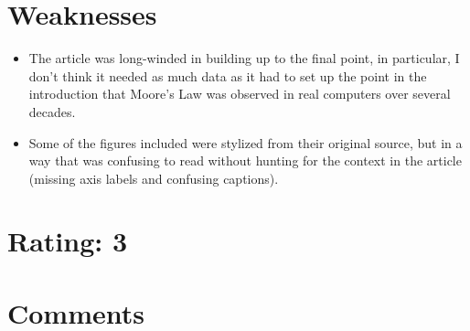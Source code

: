 \documentclass [12pt]{article}
\begin{document}
    \section{Weaknesses} %
    \label{sec:weaknesses}
        \begin{itemize}
            \item The article was long-winded in building up to the final point, in particular, I don't think it needed as much data as it had to set up the point in the introduction that Moore's Law was observed in real computers over several decades. 
            \item Some of the figures included were stylized from their original source, but in a way that was confusing to read without hunting for the context in the article (missing axis labels and confusing captions).
        \end{itemize}

    \section{Rating: 3} %
    \label{sec:rating}

    \section{Comments} %
    \label{sec:comments}
\end{document}
